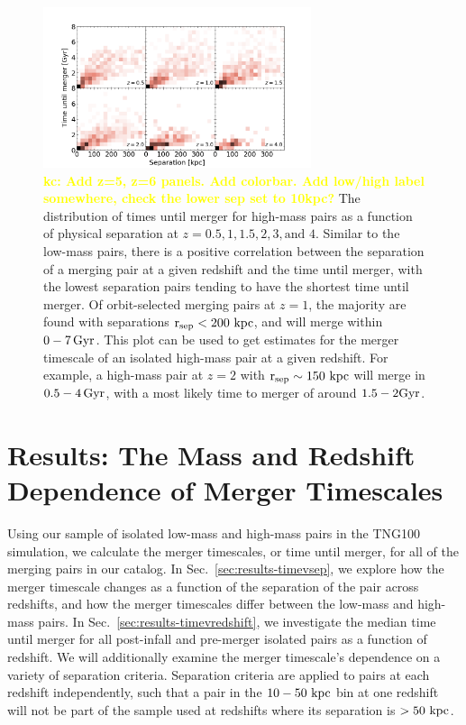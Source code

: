 \documentclass[twocolumn,linenumbers]{aastex631}
\newcommand{\kc}[1]{\textcolor{yellow}{\textbf{kc: #1}} }
\newcommand{\rsep}{\ensuremath{\rm r_{sep}}}
\begin{document}
\begin{figure}[htb]
    \begin{center}
    \includegraphics[width=0.7\textwidth]{plots/bet-on-it/3_Timevssephigh-2d.png}
    \caption{\kc{Add z=5, z=6 panels. Add colorbar. Add low/high label somewhere, check the lower sep set to 10kpc?} The distribution of times until merger for high-mass pairs as a function of physical separation at $z=0.5,1,1.5,2,3,\mbox{and }4$.
    Similar to the low-mass pairs, there is a positive correlation between the separation of a merging pair at a given redshift and the time until merger, with the lowest separation pairs tending to have the shortest time until merger.
    Of orbit-selected merging pairs at $z=1$, the majority are found with separations $\rsep<200\,\kpc$, and will merge within $0-7\, \mathrm{Gyr}$. 
    This plot can be used to get estimates for the merger timescale of an isolated high-mass pair at a given redshift. 
    For example, a high-mass pair at $z=2$ with $\rsep\sim 150\,\kpc$ will merge in $0.5-4\,\mathrm{Gyr}$, with a most likely time to merger of around $1.5-2\mathrm{Gyr}$.
    }
    \label{fig:timevssep-high}
    \end{center}
\end{figure}

\section{Results: The Mass and Redshift Dependence of Merger Timescales}
Using our sample of isolated low-mass and high-mass pairs in the TNG100 simulation, we calculate the merger timescales, or time until merger, for all of the merging pairs in our catalog. 
In Sec.~\ref{sec:results-timevsep}, we explore how the merger timescale changes as a function of the separation of the pair across redshifts, and how the merger timescales differ between the low-mass and high-mass pairs. 
In Sec.~\ref{sec:results-timevredshift}, we investigate the median time until merger for all post-infall and pre-merger isolated pairs as a function of redshift. 
We will additionally examine the merger timescale's dependence on a variety of separation criteria. 
Separation criteria are applied to pairs at each redshift independently, such that a pair in the $10-50\,\mathrm{\,kpc}$ bin at one redshift will not be part of the sample used at redshifts where its separation is $>50\,\mathrm{\,kpc}$.
\end{document}
